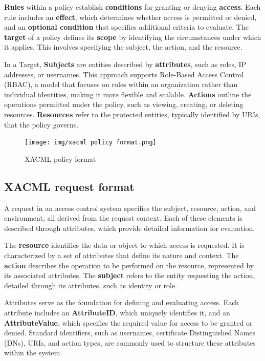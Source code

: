 \textbf{Rules} within a policy establish \textbf{conditions} for
granting or denying \textbf{access}. Each rule includes an
\textbf{effect}, which determines whether access is permitted or
denied, and an \textbf{optional condition} that specifies additional
criteria to evaluate. The \textbf{target} of a policy defines its
\textbf{scope} by identifying the circumstances under which it
applies. This involves specifying the subject, the action, and the
resource.

In a Target, \textbf{Subjects} are entities described by
\textbf{attributes}, such as roles, IP addresses, or usernames. This
approach supports Role-Based Access Control (RBAC), a model that
focuses on roles within an organization rather than individual
identities, making it more flexible and scalable. \textbf{Actions}
outline the operations permitted under the policy, such as viewing,
creating, or deleting resources. \textbf{Resources} refer to the
protected entities, typically identified by URIs, that the policy
governs.


\begin{figure}[H]
  \centering
  \texttt{[image: img/xacml policy
  format.png]}
  \caption{XACML policy format}
\end{figure}

\subsection{XACML request format}

A request in an access control system specifies the subject, resource,
action, and environment, all derived from the request context. Each of
these elements is described through attributes, which provide detailed
information for evaluation.  

The \textbf{resource} identifies the data or object to which access is
requested. It is characterized by a set of attributes that define its
nature and context. The \textbf{action} describes the operation to be
performed on the resource, represented by its associated attributes.
The \textbf{subject} refers to the entity requesting the action,
detailed through its attributes, such as identity or role.  

Attributes serve as the foundation for defining and evaluating access.
Each attribute includes an \textbf{AttributeID}, which uniquely
identifies it, and an \textbf{AttributeValue}, which specifies the
required value for access to be granted or denied. Standard
identifiers, such as usernames, certificate Distinguished Names (DNs),
URIs, and action types, are commonly used to structure these
attributes within the system.


